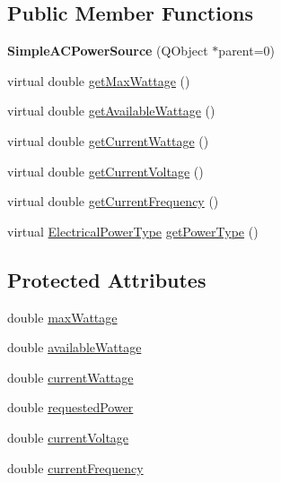 \subsection*{Public Member Functions}
\begin{DoxyCompactItemize}
\item 
\hypertarget{class_challenger604_systems_1_1_simple_a_c_power_source_afb2f7b55ab007667b09d338c17f477ed}{{\bfseries Simple\-A\-C\-Power\-Source} (Q\-Object $\ast$parent=0)}\label{class_challenger604_systems_1_1_simple_a_c_power_source_afb2f7b55ab007667b09d338c17f477ed}

\item 
virtual double \hyperlink{class_challenger604_systems_1_1_simple_a_c_power_source_ae330676157035c37441d3c8bfc198c2e}{get\-Max\-Wattage} ()
\item 
virtual double \hyperlink{class_challenger604_systems_1_1_simple_a_c_power_source_ac20e3e1da3458450951998370cd57601}{get\-Available\-Wattage} ()
\item 
virtual double \hyperlink{class_challenger604_systems_1_1_simple_a_c_power_source_a151696a75ded62c4df93b8597a5a0c2a}{get\-Current\-Wattage} ()
\item 
virtual double \hyperlink{class_challenger604_systems_1_1_simple_a_c_power_source_a04f64b1611005171ebb491b84508bcc7}{get\-Current\-Voltage} ()
\item 
virtual double \hyperlink{class_challenger604_systems_1_1_simple_a_c_power_source_ad125522705327fe9e78234c70e1e444f}{get\-Current\-Frequency} ()
\item 
virtual \hyperlink{namespace_challenger604_systems_a9ad1a793d94b97514092692cb7315afd}{Electrical\-Power\-Type} \hyperlink{class_challenger604_systems_1_1_simple_a_c_power_source_a9d50d633080d8663ec78dc33c4d8b13f}{get\-Power\-Type} ()
\end{DoxyCompactItemize}
\subsection*{Protected Attributes}
\begin{DoxyCompactItemize}
\item 
double \hyperlink{class_challenger604_systems_1_1_simple_a_c_power_source_a52f945e3cf2a2ece8a3d9f772d5cddce}{max\-Wattage}
\item 
double \hyperlink{class_challenger604_systems_1_1_simple_a_c_power_source_af9aab8bb1f32a240aba9b6c4ac969ba9}{available\-Wattage}
\item 
double \hyperlink{class_challenger604_systems_1_1_simple_a_c_power_source_a555e44c4500e6f094e9fb7ca17939648}{current\-Wattage}
\item 
double \hyperlink{class_challenger604_systems_1_1_simple_a_c_power_source_aeae97501266decbd321fe2a934d5f225}{requested\-Power}
\item 
double \hyperlink{class_challenger604_systems_1_1_simple_a_c_power_source_a10506cd4ead6a716f150baaaa4c56888}{current\-Voltage}
\item 
double \hyperlink{class_challenger604_systems_1_1_simple_a_c_power_source_a321cb77fea6e9d7a79fd69d2bd7a7227}{current\-Frequency}
\end{DoxyCompactItemize}


